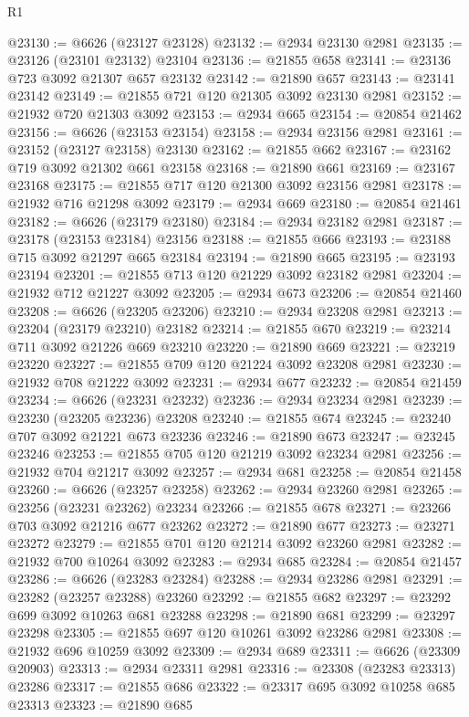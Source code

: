 \begin{lexlean}{R1}
\begin{coremodule}
@23130 := @6626 (@23127 @23128)
@23132 := @2934 @23130 @2981
@23135 := @23126 (@23101 @23132) @23104
@23136 := @21855 @658
@23141 := @23136 @723 @3092 @21307 @657 @23132
@23142 := @21890 @657
@23143 := @23141 @23142
@23149 := @21855 @721 @120 @21305 @3092 @23130 @2981
@23152 := @21932 @720 @21303 @3092
@23153 := @2934 @665
@23154 := @20854 @21462
@23156 := @6626 (@23153 @23154)
@23158 := @2934 @23156 @2981
@23161 := @23152 (@23127 @23158) @23130
@23162 := @21855 @662
@23167 := @23162 @719 @3092 @21302 @661 @23158
@23168 := @21890 @661
@23169 := @23167 @23168
@23175 := @21855 @717 @120 @21300 @3092 @23156 @2981
@23178 := @21932 @716 @21298 @3092
@23179 := @2934 @669
@23180 := @20854 @21461
@23182 := @6626 (@23179 @23180)
@23184 := @2934 @23182 @2981
@23187 := @23178 (@23153 @23184) @23156
@23188 := @21855 @666
@23193 := @23188 @715 @3092 @21297 @665 @23184
@23194 := @21890 @665
@23195 := @23193 @23194
@23201 := @21855 @713 @120 @21229 @3092 @23182 @2981
@23204 := @21932 @712 @21227 @3092
@23205 := @2934 @673
@23206 := @20854 @21460
@23208 := @6626 (@23205 @23206)
@23210 := @2934 @23208 @2981
@23213 := @23204 (@23179 @23210) @23182
@23214 := @21855 @670
@23219 := @23214 @711 @3092 @21226 @669 @23210
@23220 := @21890 @669
@23221 := @23219 @23220
@23227 := @21855 @709 @120 @21224 @3092 @23208 @2981
@23230 := @21932 @708 @21222 @3092
@23231 := @2934 @677
@23232 := @20854 @21459
@23234 := @6626 (@23231 @23232)
@23236 := @2934 @23234 @2981
@23239 := @23230 (@23205 @23236) @23208
@23240 := @21855 @674
@23245 := @23240 @707 @3092 @21221 @673 @23236
@23246 := @21890 @673
@23247 := @23245 @23246
@23253 := @21855 @705 @120 @21219 @3092 @23234 @2981
@23256 := @21932 @704 @21217 @3092
@23257 := @2934 @681
@23258 := @20854 @21458
@23260 := @6626 (@23257 @23258)
@23262 := @2934 @23260 @2981
@23265 := @23256 (@23231 @23262) @23234
@23266 := @21855 @678
@23271 := @23266 @703 @3092 @21216 @677 @23262
@23272 := @21890 @677
@23273 := @23271 @23272
@23279 := @21855 @701 @120 @21214 @3092 @23260 @2981
@23282 := @21932 @700 @10264 @3092
@23283 := @2934 @685
@23284 := @20854 @21457
@23286 := @6626 (@23283 @23284)
@23288 := @2934 @23286 @2981
@23291 := @23282 (@23257 @23288) @23260
@23292 := @21855 @682
@23297 := @23292 @699 @3092 @10263 @681 @23288
@23298 := @21890 @681
@23299 := @23297 @23298
@23305 := @21855 @697 @120 @10261 @3092 @23286 @2981
@23308 := @21932 @696 @10259 @3092
@23309 := @2934 @689
@23311 := @6626 (@23309 @20903)
@23313 := @2934 @23311 @2981
@23316 := @23308 (@23283 @23313) @23286
@23317 := @21855 @686
@23322 := @23317 @695 @3092 @10258 @685 @23313
@23323 := @21890 @685

\end{coremodule}
\end{lexlean}
